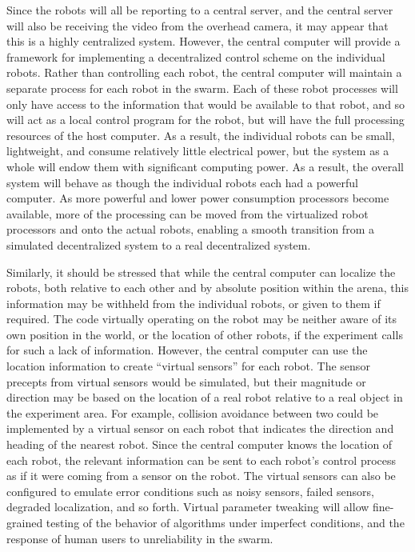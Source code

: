 \documentclass[]{article}
\begin{document}
Since the robots will all be reporting to a central server, and the central server will also be receiving the video from the overhead camera, it may appear that this is a highly centralized system. 
However, the central computer will provide a framework for implementing a decentralized control scheme on the individual robots. 
Rather than controlling each robot, the central computer will maintain a separate process for each robot in the swarm. 
Each of these robot processes will only have access to the information that would be available to that robot, and so will act as a local control program for the robot, but will have the full processing resources of the host computer. 
As a result, the individual robots can be small, lightweight, and consume relatively little electrical power, but the system as a whole will endow them with significant computing power. 
As a result, the overall system will behave as though the individual robots each had a powerful computer. 
As more powerful and lower power consumption processors become available, more of the processing can be moved from the virtualized robot processors and onto the actual robots, enabling a smooth transition from a simulated decentralized system to a real decentralized system. 

Similarly, it should be stressed that while the central computer can localize the robots, both relative to each other and by absolute position within the arena, this information may be withheld from the individual robots, or given to them if required. 
The code virtually operating on the robot may be neither aware of its own position in the world, or the location of other robots, if the experiment calls for such a lack of information. 
However, the central computer can use the location information to create ``virtual sensors'' for each robot. 
The sensor precepts from virtual sensors would be simulated, but their magnitude or direction may be based on the location of a real robot relative to a real object in the experiment area. 
For example, collision avoidance between two could be implemented by a virtual sensor on each robot that indicates the direction and heading of the nearest robot. 
Since the central computer knows the location of each robot, the relevant information can be sent to each robot's control process as if it were coming from a sensor on the robot. 
The virtual sensors can also be configured to emulate error conditions such as noisy sensors, failed sensors, degraded localization, and so forth.
Virtual parameter tweaking will allow fine-grained testing of the behavior of algorithms under imperfect conditions, and the response of human users to unreliability in the swarm. 
\end{document}
